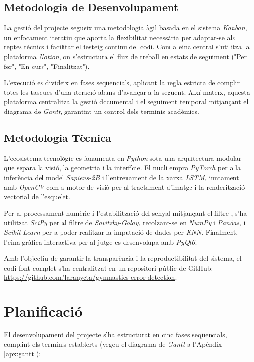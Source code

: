\documentclass[10pt,a4paper,twocolumn,twoside]{article}
\begin{document}
\subsection{Metodologia de Desenvolupament}
La gestió del projecte segueix una metodologia àgil basada en el sistema \textit{Kanban}, un enfocament iteratiu que aporta la flexibilitat necessària per adaptar-se als reptes tècnics i facilitar el testeig continu del codi. Com a eina central s'utilitza la plataforma \textit{Notion}, on s'estructura el flux de treball en estats de seguiment ("Per fer", "En curs", "Finalitzat"). 

L'execució es divideix en fases seqüencials, aplicant la regla estricta de complir totes les tasques d'una iteració abans d'avançar a la següent. Així mateix, aquesta plataforma centralitza la gestió documental i el seguiment temporal mitjançant el diagrama de \textit{Gantt}, garantint un control dels terminis acadèmics.

\subsection{Metodologia Tècnica}
L'ecosistema tecnològic es fonamenta en \textit{Python} sota una arquitectura modular que separa la visió, la geometria i la interfície. El nucli empra \textit{PyTorch} per a la inferència del model \textit{Sapiens-2B} i l'entrenament de la xarxa \textit{LSTM}, juntament amb \textit{OpenCV} com a motor de visió per al tractament d'imatge i la renderització vectorial de l'esquelet. 

Per al processament numèric i l'estabilització del senyal mitjançant el filtre , s'ha utilitzat \textit{SciPy} per al filtre de \textit{Savitzky-Golay}, recolzant-se en \textit{NumPy} i \textit{Pandas}, i \textit{Scikit-Learn} per a poder realitzar la imputació de dades per \textit{KNN}. Finalment, l'eina gràfica interactiva per al jutge es desenvolupa amb \textit{PyQt6}. 

Amb l'objectiu de garantir la transparència i la reproductibilitat del sistema, el codi font complet s'ha centralitzat en un repositori públic de GitHub: \url{https://github.com/laranyeta/gymnastics-error-detection}.

\section{Planificació}
El desenvolupament del projecte s'ha estructurat en cinc fases seqüencials, complint els terminis establerts (vegeu el diagrama de \textit{Gantt} a l'Apèndix \ref{apx:gantt}):
\end{document}
